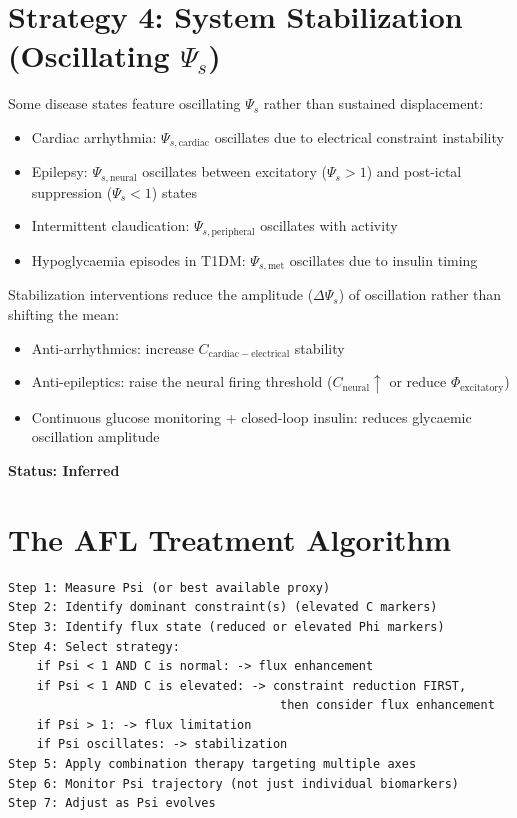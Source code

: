 \documentclass[12pt,a4paper]{article}
\begin{document}
\section{Strategy 4: System Stabilization (Oscillating $\Psi_s$)}

Some disease states feature oscillating $\Psi_s$ rather than sustained displacement:
\begin{itemize}
    \item Cardiac arrhythmia: $\Psi_{s,\mathrm{cardiac}}$ oscillates due to electrical constraint instability
    \item Epilepsy: $\Psi_{s,\mathrm{neural}}$ oscillates between excitatory ($\Psi_s > 1$) and post-ictal suppression ($\Psi_s < 1$) states
    \item Intermittent claudication: $\Psi_{s,\mathrm{peripheral}}$ oscillates with activity
    \item Hypoglycaemia episodes in T1DM: $\Psi_{s,\mathrm{met}}$ oscillates due to insulin timing
\end{itemize}

Stabilization interventions reduce the amplitude ($\Delta\Psi_s$) of oscillation rather than shifting the mean:
\begin{itemize}
    \item Anti-arrhythmics: increase $C_{\mathrm{cardiac-electrical}}$ stability
    \item Anti-epileptics: raise the neural firing threshold ($C_{\mathrm{neural}} \uparrow$ or reduce $\Phi_{\mathrm{excitatory}}$)
    \item Continuous glucose monitoring + closed-loop insulin: reduces glycaemic oscillation amplitude
\end{itemize}

\textbf{Status: Inferred}

\section{The AFL Treatment Algorithm}

\begin{verbatim}
Step 1: Measure Psi (or best available proxy)
Step 2: Identify dominant constraint(s) (elevated C markers)
Step 3: Identify flux state (reduced or elevated Phi markers)
Step 4: Select strategy:
    if Psi < 1 AND C is normal: -> flux enhancement
    if Psi < 1 AND C is elevated: -> constraint reduction FIRST,
                                      then consider flux enhancement
    if Psi > 1: -> flux limitation
    if Psi oscillates: -> stabilization
Step 5: Apply combination therapy targeting multiple axes
Step 6: Monitor Psi trajectory (not just individual biomarkers)
Step 7: Adjust as Psi evolves
\end{verbatim}
\end{document}

